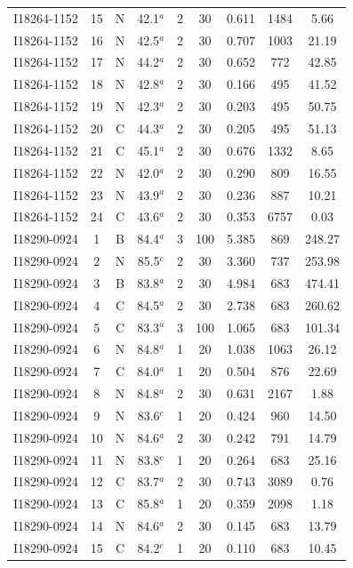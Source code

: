 \begin{table}
\begin{tabular}{ccccccccc}
I18264-1152 & 15 & N & 42.1$^{a}$ & 2 & 30 & 0.611 & 1484 & 5.66 \\
I18264-1152 & 16 & N & 42.5$^{a}$ & 2 & 30 & 0.707 & 1003 & 21.19 \\
I18264-1152 & 17 & N & 44.2$^{a}$ & 2 & 30 & 0.652 & 772 & 42.85 \\
I18264-1152 & 18 & N & 42.8$^{a}$ & 2 & 30 & 0.166 & 495 & 41.52 \\
I18264-1152 & 19 & N & 42.3$^{a}$ & 2 & 30 & 0.203 & 495 & 50.75 \\
I18264-1152 & 20 & C & 44.3$^{a}$ & 2 & 30 & 0.205 & 495 & 51.13 \\
I18264-1152 & 21 & C & 45.1$^{a}$ & 2 & 30 & 0.676 & 1332 & 8.65 \\
I18264-1152 & 22 & N & 42.0$^{a}$ & 2 & 30 & 0.290 & 809 & 16.55 \\
I18264-1152 & 23 & N & 43.9$^{a}$ & 2 & 30 & 0.236 & 887 & 10.21 \\
I18264-1152 & 24 & C & 43.6$^{a}$ & 2 & 30 & 0.353 & 6757 & 0.03 \\
I18290-0924 & 1 & B & 84.4$^{a}$ & 3 & 100 & 5.385 & 869 & 248.27 \\
I18290-0924 & 2 & N & 85.5$^{c}$ & 2 & 30 & 3.360 & 737 & 253.98 \\
I18290-0924 & 3 & B & 83.8$^{a}$ & 2 & 30 & 4.984 & 683 & 474.41 \\
I18290-0924 & 4 & C & 84.5$^{a}$ & 2 & 30 & 2.738 & 683 & 260.62 \\
I18290-0924 & 5 & C & 83.3$^{a}$ & 3 & 100 & 1.065 & 683 & 101.34 \\
I18290-0924 & 6 & N & 84.8$^{a}$ & 1 & 20 & 1.038 & 1063 & 26.12 \\
I18290-0924 & 7 & C & 84.0$^{a}$ & 1 & 20 & 0.504 & 876 & 22.69 \\
I18290-0924 & 8 & N & 84.8$^{a}$ & 2 & 30 & 0.631 & 2167 & 1.88 \\
I18290-0924 & 9 & N & 83.6$^{c}$ & 1 & 20 & 0.424 & 960 & 14.50 \\
I18290-0924 & 10 & N & 84.6$^{a}$ & 2 & 30 & 0.242 & 791 & 14.79 \\
I18290-0924 & 11 & N & 83.8$^{c}$ & 1 & 20 & 0.264 & 683 & 25.16 \\
I18290-0924 & 12 & C & 83.7$^{a}$ & 2 & 30 & 0.743 & 3089 & 0.76 \\
I18290-0924 & 13 & C & 85.8$^{a}$ & 1 & 20 & 0.359 & 2098 & 1.18 \\
I18290-0924 & 14 & N & 84.6$^{a}$ & 2 & 30 & 0.145 & 683 & 13.79 \\
I18290-0924 & 15 & C & 84.2$^{e}$ & 1 & 20 & 0.110 & 683 & 10.45 \\

\end{tabular}
\end{table}
